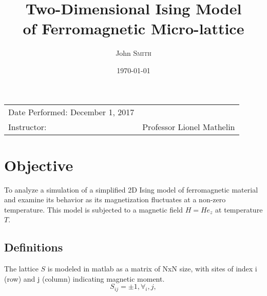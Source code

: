 \documentclass{article}
\title{Two-Dimensional Ising Model \\ of Ferromagnetic Micro-lattice} %
\author{John \textsc{Smith}} %
\date{\today} %
\begin{document}
\maketitle %

\begin{center}
\begin{tabular}{l r}
Date Performed: December 1, 2017 \\ %
Instructor: & Professor Lionel Mathelin %
\end{tabular}
\end{center}



\section{Objective}

To analyze a simulation of a simplified 2D Ising model of ferromagnetic material and examine its behavior as its magnetization fluctuates at a non-zero temperature. This model is subjected to a magnetic field $H = H e_z$ at temperature $T$.


\subsection{Definitions}
\label{definitions}
\begin{description}
\item [Micro-lattice Structure]
The lattice $S$ is modeled in matlab as a matrix of NxN size, with sites of index i (row) and j (column) indicating magnetic moment.
\begin{equation}
S_{ij} = \pm 1, \forall_i, j,
\end{equation}

\item
\end{description} 
 
\end{document}
